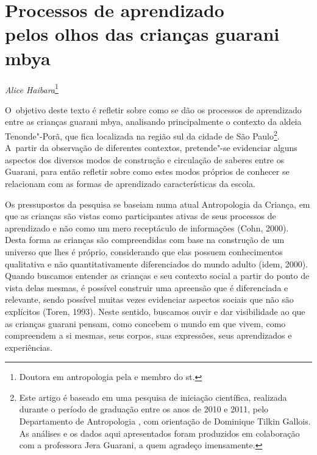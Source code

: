 \thispagestyle{empty}

\chapter*{Processos de aprendizado\\ pelos olhos das crianças guarani mbya}


\begin{flushright}
\emph{Alice Haibara}\footnote{Doutora em antropologia pela  e membro do
st.}
\end{flushright}

\noindent
O~objetivo deste texto é refletir sobre como se dão os processos de
aprendizado entre as crianças guarani mbya, analisando principalmente o
contexto da aldeia Tenonde"-Porã, que fica localizada na região sul da
cidade de São Paulo\footnote{Este artigo é baseado em uma pesquisa de
iniciação científica, realizada durante o período de graduação entre os
anos de 2010 e 2011, pelo Departamento de Antropologia , com
orientação de Dominique Tilkin Gallois. As análises e os dados aqui
apresentados foram produzidos em colaboração com a professora Jera
Guarani, a quem agradeço imensamente.}. A~partir da observação de
diferentes contextos, pretende"-se evidenciar alguns aspectos dos
diversos modos de construção e circulação de saberes entre os Guarani,
para então refletir sobre como estes modos próprios de conhecer se
relacionam com as formas de aprendizado características da escola.

Os pressupostos da pesquisa se baseiam numa atual Antropologia da
Criança, em que as crianças são vistas como participantes ativas de
seus processos de aprendizado e não como um mero receptáculo de
informações (Cohn, 2000). Desta forma as crianças são compreendidas com
base na construção de um universo que lhes é próprio, considerando que
elas possuem conhecimentos qualitativa e não quantitativamente
diferenciados do mundo adulto (idem, 2000). Quando buscamos entender as
crianças e seu contexto social a partir do ponto de vista delas mesmas,
é possível construir uma apreensão que é diferenciada e relevante,
sendo possível muitas vezes evidenciar aspectos sociais que não são
explícitos (Toren, 1993). Neste sentido, buscamos ouvir e dar
visibilidade ao que as crianças guarani pensam, como concebem o mundo
em que vivem, como compreendem a si mesmas, seus corpos, suas
expressões, seus aprendizados e experiências. 

